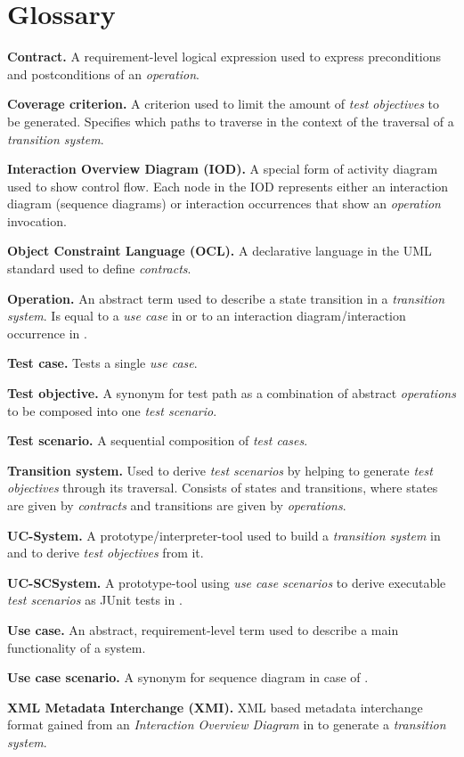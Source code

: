 \chapter{Glossary} \label{glossary}

\textbf{Contract.} A requirement-level logical expression used to express preconditions and postconditions of an \textit{operation}.

\textbf{Coverage criterion.} A criterion used to limit the amount of \textit{test objectives} to be generated. Specifies which paths to traverse in the context of the traversal of a \textit{transition system}. 

\textbf{Interaction Overview Diagram (IOD).} A special form of activity diagram used to show control flow. Each node in the IOD represents either an interaction diagram (sequence diagrams) or interaction occurrences that show an \textit{operation} invocation.

\textbf{Object Constraint Language (OCL).} A declarative language in the UML standard used to define \textit{contracts}. 

\textbf{Operation.} An abstract term used to describe a state transition in a \textit{transition system}. Is equal to a \textit{use case} in \cite{ClementineNebut2006} or to an interaction diagram/interaction occurrence in \cite{NajlaRaza2007}.

\textbf{Test case.} Tests a single \textit{use case}.

\textbf{Test objective.} A synonym for test path as a combination of abstract \textit{operations} to be composed into one \textit{test scenario}. 

\textbf{Test scenario.} A sequential composition of \textit{test cases}.

\textbf{Transition system.} Used to derive \textit{test scenarios} by helping to generate \textit{test objectives} through its traversal. Consists of states and transitions, where states are given by \textit{contracts} and transitions are given by \textit{operations}. 

\textbf{UC-System.} A prototype/interpreter-tool used to build a \textit{transition system} in \cite{ClementineNebut2006} and to derive \textit{test objectives} from it. 

\textbf{UC-SCSystem.} A prototype-tool using \textit{use case scenarios} to derive executable \textit{test scenarios} as JUnit tests in \cite{ClementineNebut2006}. 

\textbf{Use case.} An abstract, requirement-level term used to describe a main functionality of a system.

\textbf{Use case scenario.} A synonym for sequence diagram in case of \cite{ClementineNebut2006}.

\textbf{XML Metadata Interchange (XMI).} XML based metadata interchange format gained from an \textit{Interaction Overview Diagram} in \cite{NajlaRaza2007} to generate a \textit{transition system}.
